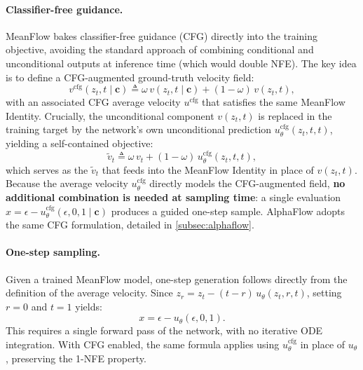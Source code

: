 

\paragraph{Classifier-free guidance.} MeanFlow bakes classifier-free guidance (CFG) directly into the training objective, avoiding the standard approach of combining conditional and unconditional outputs at inference time (which would double NFE). The key idea is to define a CFG-augmented ground-truth velocity field:
\begin{equation}
    v^{\text{cfg}}(z_t, t \mid \mathbf{c}) \triangleq \omega \, v(z_t, t \mid \mathbf{c}) + (1-\omega) \, v(z_t, t),
\end{equation}
with an associated CFG average velocity $u^{\text{cfg}}$ that satisfies the same MeanFlow Identity. Crucially, the unconditional component $v(z_t, t)$ is replaced in the training target by the network's own unconditional prediction $u_\theta^{\text{cfg}}(z_t, t, t)$, yielding a self-contained objective:
\begin{equation}
    \tilde{v}_t \triangleq \omega \, v_t + (1-\omega) \, u_\theta^{\text{cfg}}(z_t, t, t),
\end{equation}
which serves as the $\tilde{v}_t$ that feeds into the MeanFlow Identity in place of $v(z_t, t)$. Because the average velocity $u_\theta^{\text{cfg}}$ directly models the CFG-augmented field, \textbf{no additional combination is needed at sampling time}: a single evaluation $x = \epsilon - u_\theta^{\text{cfg}}(\epsilon, 0, 1 \mid \mathbf{c})$ produces a guided one-step sample. AlphaFlow adopts the same CFG formulation, detailed in \cref{subsec:alphaflow}.

\paragraph{One-step sampling.} Given a trained MeanFlow model, one-step generation follows directly from the definition of the average velocity. Since $z_r = z_t - (t-r) \, u_\theta(z_t, r, t)$, setting $r=0$ and $t=1$ yields:
\begin{equation}
    x = \epsilon - u_\theta(\epsilon, 0, 1).
\end{equation}
This requires a single forward pass of the network, with no iterative ODE integration. With CFG enabled, the same formula applies using $u_\theta^{\text{cfg}}$ in place of $u_\theta$, preserving the 1-NFE property.



